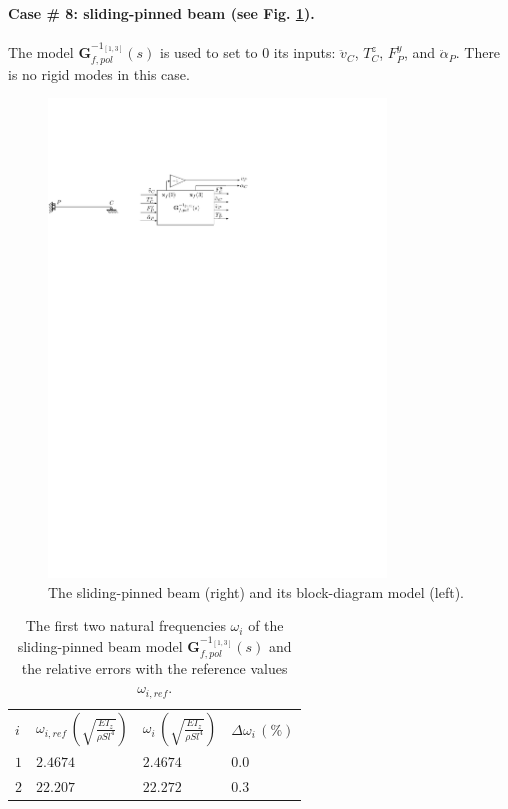 \documentclass[smallcondensed]{svjour3}     %
\begin{document}
\FloatBarrier
\paragraph{Case \# 8:  sliding-pinned beam (see Fig. \ref{fig:Tsp}).} The model $\mathbf{G}_{f,pol}^{-1_{[1,3]}}(s)$ is used to set to $0$ its inputs: $\ddot{v}_C$, $T^z_C$, $F^y_P$, and $\ddot{\alpha}_P$. There is no rigid modes in this case.
\begin{figure}[htbp!]
  \includegraphics[width=0.8\textwidth]{Tspb}
\caption{The sliding-pinned beam (right) and its block-diagram model (left).}
\label{fig:Tsp} 
\end{figure}
\begin{table}[htbp!]
\caption{The first two natural frequencies $\omega_i$ of the sliding-pinned beam model $\mathbf{G}_{f,pol}^{-1_{[1,3]}}(s)$ and the relative errors with the reference values $\omega_{i,ref}$.}
\label{tab:Tsp}       %
\begin{tabular}{llll}
\hline\noalign{\smallskip}
  $i$ & $\omega_{i,ref}\,\left(\sqrt{\frac{EI_z}{\rho S l^4}}\right)$ &  $\omega_i\,\left(\sqrt{\frac{EI_z}{\rho S l^4}}\right)$ &  $\Delta \omega_i\,(\%)$ \\
\noalign{\smallskip}\hline\noalign{\smallskip}
$1$ & $2.4674$ & $2.4674$  & $0.0$ \\ 
$2$ & $22.207$ & $22.272$ & $0.3$ \\
\hline
\end{tabular}
\end{table}
\end{document}
